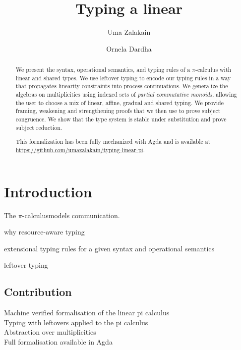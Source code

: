 \documentclass[a4paper,UKenglish,cleveref, autoref, thm-restate,authorcolumns]{lipics-v2019}
\title{Typing a linear \picalc}
\author{Uma Zalakain}{University of Glasgow, Scotland}
       {u.zalakain.1@research.gla.ac.uk}{https://orcid.org/0000-0002-3268-9338}{}
\author{Ornela Dardha}{University of Glasgow, Scotland}
       {ornela.dardha@glasgow.ac.uk}{https://orcid.org/0000-0001-9927-7875}{}
\newcommand{\picalc}{$\pi$-calculus}
\begin{document}
\maketitle
{}

\begin{abstract}
  We present the syntax, operational semantics, and typing rules of a \picalc{} with linear and shared types.
  We use leftover typing \cite{Allais2018a} to encode our typing rules in a way that propagates linearity constraints into process continuations.
  We generalize the algebras on multiplicities using indexed sets of \emph{partial commutative monoids}, allowing the user to choose a mix of linear, affine, gradual and shared typing.
  We provide framing, weakening and strengthening proofs that we then use to prove subject congruence.
  We show that the type system is stable under substitution and prove subject reduction.

  This formalization has been fully mechanized with Agda and is available at \url{https://github.com/umazalakain/typing-linear-pi}.
\end{abstract}

\section{Introduction}

The \picalc models communication.

why resource-aware typing

extensional typing rules for a given syntax and operational semantics

leftover typing

\subsection{Contribution}

\begin{description}
  \item [Machine verified formalisation of the linear pi calculus]

  \item [Typing with leftovers applied to the pi calculus]

  \item [Abstraction over multiplicities]

  \item [Full formalisation available in Agda]
\end{description}
\end{document}
